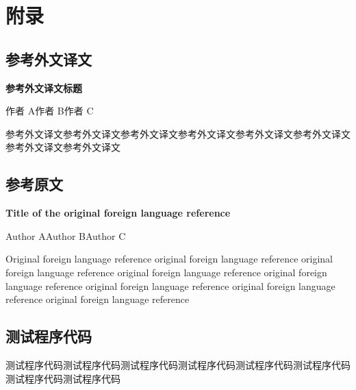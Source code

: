 \section*{\heiti{}\bfseries 附\qquad 录}
\appendix
\renewcommand{\thesubsection}{\Alph{subsection}} %

\subsection{参考外文译文}

\begin{center}
\heiti{}\bfseries
参考外文译文标题
\end{center}

\begin{center}
作者 A\qquad 作者 B\qquad 作者 C
\end{center}

参考外文译文参考外文译文参考外文译文参考外文译文参考外文译文参考外文译文参考外文译文参考外文译文

\subsection{参考原文}

\begin{center}
\bfseries
Title of the original foreign language reference
\end{center}

\begin{center}
Author A\qquad Author B\qquad Author C
\end{center}

Original foreign language reference original foreign language reference original foreign language reference original foreign language reference original foreign language reference original foreign language reference original foreign language reference original foreign language reference

\subsection{测试程序代码}

测试程序代码测试程序代码测试程序代码测试程序代码测试程序代码测试程序代码测试程序代码测试程序代码
